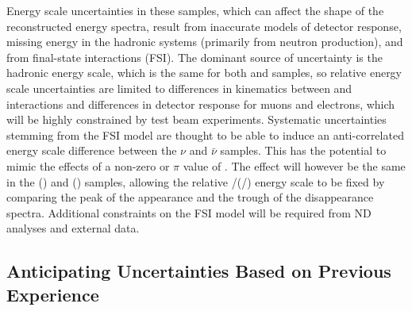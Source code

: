 
Energy scale uncertainties in these samples, which can affect the shape of the reconstructed energy spectra,
result from
inaccurate models of detector response, missing energy in the hadronic systems (primarily from neutron production),
and from final-state interactions (FSI). The dominant source of uncertainty is the hadronic energy scale,
which is the same for both \nue and \numu samples, so relative energy scale uncertainties are limited to
differences in kinematics between \numu and \nue interactions and differences in detector response for
muons and electrons, which will be highly constrained by test beam experiments.
Systematic uncertainties stemming from the FSI model are thought to be able to induce an anti-correlated 
energy scale difference between the $\nu$ and $\bar\nu$ samples. This has the potential to mimic the effects
of a non-zero or $\pi$ value of \deltacp. The effect will however be the same in the \nue (\anue) and \numu
(\anumu) samples, allowing the relative \nue/\numu (\anue/\anumu) energy scale to be fixed by comparing
the peak of the appearance and the trough of the disappearance spectra. Additional constraints on the FSI 
model will be required from ND analyses and external data.

\subsection{Anticipating Uncertainties Based on Previous Experience}

